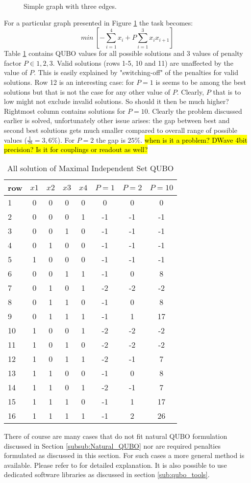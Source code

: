 \begin{figure}[h]
	\label{fig:graph_1}
	\caption{Simple graph with three edges.}
    \centering
    \def\svgwidth{0.25\textwidth}
    
\end{figure}

For a particular graph presented in Figure \ref{fig:graph_1} the task becomes:
\[min\ \left[-\sum_{i=1}^4x_i + P\sum_{i=1}^3 x_i x_{i+1}\right]\]
Table \ref{tab:qubo_results} contains QUBO values for all possible solutions and 3 values of penalty factor $P\in{1,2,3}$. Valid solutions (rows 1-5, 10 and 11) are unaffected by the value of $P$. This is easily explained by "switching-off" of the penalties for valid solutions. Row 12 is an interesting case: for $P=1$ is seems to be among the best solutions but that is not the case for any other value of $P$. Clearly, $P$ that is to low might not exclude invalid solutions. So should it then be much higher? Rightmost column contains solutions for $P=10$. Clearly the problem discussed earlier is solved, unfortunately other issue arises: the gap between best and second best solutions gets much smaller compared to overall range of possible values ($ \frac{1}{28}=3,6\% $). For $P=2$ the gap is $25\%$. \hl{when is it a problem? DWave 4bit precision? Is it for couplings or readout as well?}

\begin{table}
\begin{center}
\begin{tabular}{l | c c c c c c c }
row&$x1$&$x2$&$x3$&$x4$&$P=1$&$P=2$&$P=10$\\
 \hline
1&0&0&0&0&0&0&0\\ 
2&0&0&0&1&-1&-1&-1\\ 
3&0&0&1&0&-1&-1&-1\\
4&0&1&0&0&-1&-1&-1\\
5&1&0&0&0&-1&-1&-1\\ 
6&0&0&1&1&-1&0&8\\ 
7&0&1&0&1&-2&-2&-2\\ 
8&0&1&1&0&-1&0&8\\ 
9&0&1&1&1&-1&1&17\\ 
10&1&0&0&1&-2&-2&-2\\ 
11&1&0&1&0&-2&-2&-2\\ 
12&1&0&1&1&-2&-1&7\\ 
13&1&1&0&0&-1&0&8\\ 
14&1&1&0&1&-2&-1&7\\ 
15&1&1&1&0&-1&1&17\\ 
16&1&1&1&1&-1&2&26\\
\end{tabular}
\end{center}
\caption{All solution of Maximal Independent Set QUBO}
\label{tab:qubo_results}
\end{table}

There of course are many cases that do not fit natural QUBO formulation discussed in Section \ref{subsub:Natural_QUBO} nor are required penalties formulated as discussed in this section. For such cases a more general method is available. Please refer to \cite{glover_quantum_2019} for detailed explanation. It is also possible to use dedicated software libraries as discussed in section \ref{sub:qubo_tools}.